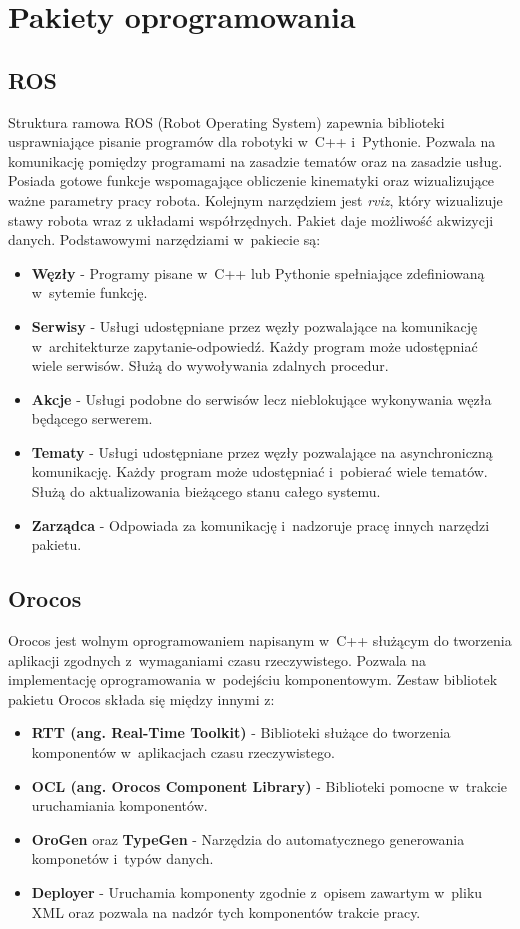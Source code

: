 	\section{Pakiety oprogramowania}
	\subsection{ROS}
	Struktura ramowa ROS (Robot Operating System)\cite{bib:ROS} zapewnia biblioteki usprawniające pisanie programów dla robotyki w~C++ i~Pythonie. Pozwala na komunikację pomiędzy programami na zasadzie tematów oraz na zasadzie usług. Posiada gotowe funkcje wspomagające obliczenie kinematyki oraz wizualizujące ważne parametry pracy robota. Kolejnym narzędziem jest \textit{rviz}, który wizualizuje stawy robota wraz z układami współrzędnych. Pakiet daje możliwość akwizycji danych. Podstawowymi narzędziami w~pakiecie są:
	\begin{itemize}
		\item \textbf{Węzły} - Programy pisane w~C++ lub Pythonie spełniające zdefiniowaną w~sytemie funkcję.
		\item \textbf{Serwisy} - Usługi udostępniane przez węzły pozwalające na komunikację w~architekturze zapytanie-odpowiedź. Każdy program może udostępniać wiele serwisów. Służą do wywoływania zdalnych procedur.
		\item \textbf{Akcje} - Usługi podobne do serwisów lecz nieblokujące wykonywania węzła będącego serwerem.
		\item \textbf{Tematy} - Usługi udostępniane przez węzły pozwalające na asynchroniczną komunikację. Każdy program może udostępniać i~pobierać wiele tematów. Służą do aktualizowania bieżącego stanu całego systemu.
		\item \textbf{Zarządca} - Odpowiada za komunikację i~nadzoruje pracę innych narzędzi pakietu.
	\end{itemize}
	\subsection{Orocos}
	Orocos \cite{bib:Orocos} jest wolnym oprogramowaniem napisanym w~C++ służącym do tworzenia aplikacji zgodnych z~wymaganiami czasu rzeczywistego. Pozwala na implementację  oprogramowania w~podejściu komponentowym. Zestaw bibliotek pakietu Orocos składa się między innymi z:
	\begin{itemize}
		\item \textbf{RTT (ang. Real-Time Toolkit)} - Biblioteki służące do  tworzenia komponentów w~aplikacjach czasu rzeczywistego.
		\item \textbf{OCL (ang. Orocos Component Library)} - Biblioteki pomocne w~trakcie uruchamiania komponentów.
		\item \textbf{OroGen} oraz \textbf{TypeGen} - Narzędzia do automatycznego generowania komponetów i~typów danych.
		\item \textbf{Deployer} - Uruchamia komponenty zgodnie z~opisem zawartym w~pliku XML oraz pozwala na nadzór tych komponentów trakcie pracy.
	\end{itemize}

